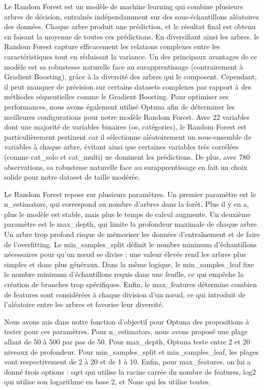 \documentclass[mstat,12pt]{unswthesis}
\begin{document}
Le Random Forest est un modèle de machine learning qui combine plusieurs arbres de décision, entraînés indépendamment sur des sous-échantillons aléatoires des données. Chaque arbre produit une prédiction, et le résultat final est obtenu en faisant la moyenne de toutes ces prédictions. En diversifiant ainsi les arbres, le Random Forest capture efficacement les relations complexes entre les caractéristiques tout en réduisant la variance. Un des principaux avantages de ce modèle est sa robustesse naturelle face au surapprentissage (contrairement à Gradient Boosting), grâce à la diversité des arbres qui le composent. Cependant, il peut manquer de précision sur certains datasets complexes par rapport à des méthodes séquentielles comme le Gradient Boosting. Pour optimiser ses performances, nous avons également utilisé Optuna afin de déterminer les meilleures configurations pour notre modèle Random Forest. Avec 22 variables dont une majorité de variables binaires (os, catégories), le Random Forest est particulièrement pertinent car il sélectionne aléatoirement un sous-ensemble de variables à chaque arbre, évitant ainsi que certaines variables très corrélées (comme cat\_solo et cat\_multi) ne dominent les prédictions. De plus, avec 780 observations, sa robustesse naturelle face au surapprentissage en fait un choix solide pour notre dataset de taille modérée.

Le Random Forest repose sur plusieurs paramètres. Un premier paramètre est le n\_estimators, qui correspond au nombre d'arbres dans la forêt. Plus il y en a, plus le modèle est stable, mais plus le temps de calcul augmente. Un deuxième paramètre est le max\_depth, qui limite la profondeur maximale de chaque arbre. Un arbre trop profond risque de mémoriser les données d'entraînement et de faire de l'overfitting. Le min\_samples\_split définit le nombre minimum d'échantillons nécessaires pour qu'un nœud se divise : une valeur élevée rend les arbres plus simples et donc plus généraux. Dans la même logique, le min\_samples\_leaf fixe le nombre minimum d'échantillons requis dans une feuille, ce qui empêche la création de branches trop spécifiques. Enfin, le max\_features détermine combien de features sont considérées à chaque division d'un nœud, ce qui introduit de l'aléatoire entre les arbres et favorise leur diversité.

Nous avons mis dans notre fonction d'objectif pour Optuna des propositions à tester pour ces paramètres. Pour n\_estimators, nous avons proposé une plage allant de 50 à 500 par pas de 50. Pour max\_depth, Optuna teste entre 2 et 20 niveaux de profondeur. Pour min\_samples\_split et min\_samples\_leaf, les plages vont respectivement de 2 à 20 et de 1 à 10. Enfin, pour max\_features, on lui a donné trois options : sqrt qui utilise la racine carrée du nombre de features, log2 qui utilise son logarithme en base 2, et None qui les utilise toutes. \\
\end{document}
